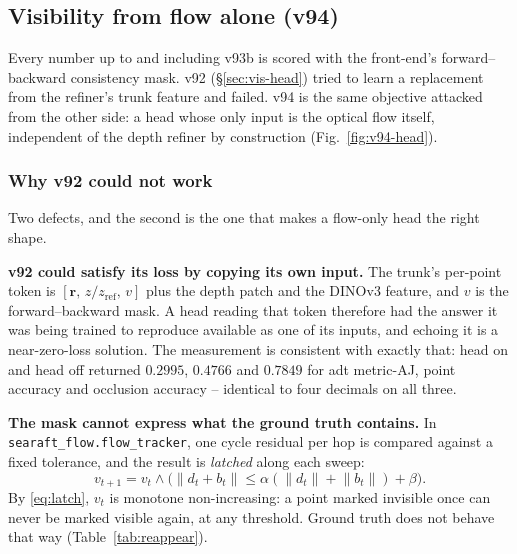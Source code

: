 \documentclass[11pt,a4paper]{article}
\begin{document}
\subsection{Visibility from flow alone (v94)}
\label{sec:v94}

Every number up to and including v93b is scored with the front-end's forward--backward
consistency mask. v92 (\S\ref{sec:vis-head}) tried to learn a replacement from the refiner's
trunk feature and failed. v94 is the same objective attacked from the other side: a head whose
only input is the optical flow itself, independent of the depth refiner by construction
(Fig.~\ref{fig:v94-head}).

\subsubsection{Why v92 could not work}
Two defects, and the second is the one that makes a flow-only head the right shape.

\textbf{v92 could satisfy its loss by copying its own input.} The trunk's per-point token is
$[\mathbf{r},\,z/z_{\text{ref}},\,v]$ plus the depth patch and the DINOv3 feature, and $v$ is
the forward--backward mask. A head reading that token therefore had the answer it was being
trained to reproduce available as one of its inputs, and echoing it is a near-zero-loss
solution. The measurement is consistent with exactly that: head on and head off returned
$0.2995$, $0.4766$ and $0.7849$ for adt metric-AJ, point accuracy and occlusion accuracy --
identical to four decimals on all three.

\textbf{The mask cannot express what the ground truth contains.} In
\texttt{searaft\_flow.flow\_tracker}, one cycle residual per hop is compared against a fixed
tolerance, and the result is \emph{latched} along each sweep:
\begin{equation}
v_{t+1} = v_t \wedge \big(\lVert d_t + b_t\rVert \le \alpha(\lVert d_t\rVert + \lVert b_t\rVert) + \beta\big).
\label{eq:latch}
\end{equation}
By \eqref{eq:latch}, $v_t$ is monotone non-increasing: a point marked invisible once can never
be marked visible again, at any threshold. Ground truth does not behave that way
(Table~\ref{tab:reappear}).
\end{document}
